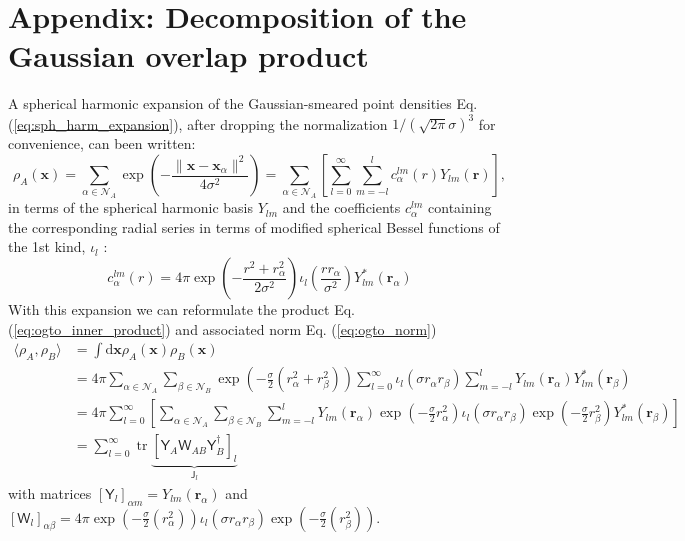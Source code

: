 \documentclass[journal=jctcce,manuscript=article]{achemso}
\newcommand{\eref}[1]{{Eq. (\ref{#1})}}
\newcommand{\tr}{\operatorname{tr}}
\newcommand{\xb}{\mathbf{x}}
\newcommand{\rb}{\mathbf{r}}
\newcommand{\Js}{\mathsf{J}}
\newcommand{\Ys}{\mathsf{Y}}
\newcommand{\Ws}{\mathsf{W}}
\newcommand{\Nc}{\mathcal{N}}
\begin{document}
\section*{Appendix: Decomposition of the Gaussian overlap product} \label{app:soap}
A spherical harmonic expansion of the Gaussian-smeared point densities  \eref{eq:sph_harm_expansion}, after dropping the normalization $1/(\sqrt{2\pi}\sigma)^3$ for convenience, can been written:
\begin{equation}
\rho_A(\xb) = 
\sum_{\alpha\in\Nc_A} \exp\left(- \frac{\|\xb-\xb_{\alpha}\|^2}{4 \sigma^2}\right) 
= \sum_{\alpha\in\Nc_A} \left[ \sum_{l=0}^\infty \sum_{m=-l}^l c_\alpha^{lm}(r) Y_{lm} (\rb) \right] , 
\end{equation}
in terms of the spherical harmonic basis $Y_{lm}$ and the coefficients $c_\alpha^{lm}$ containing the corresponding radial series in terms of modified spherical Bessel functions of the 1st kind, $\iota_l$ :
\begin{equation}
c_\alpha^{lm}(r) = 4 \pi 
\exp \left( -\frac{r^2 +r_\alpha^2}{2\sigma^2} \right) 
\iota_l \left(\frac{r r_\alpha}{\sigma^2}\right)  
Y^*_{lm} (\rb_\alpha) 
\end{equation}  
With this expansion we can reformulate the product \eref{eq:ogto_inner_product} and associated norm \eref{eq:ogto_norm}
\begin{equation}
\begin{split}
\langle \rho_A, \rho_B \rangle 
&=
\int \mathrm{d}\xb \rho_A(\xb) \rho_B(\xb)  \\
&= 4 \pi \sum_{\alpha\in\Nc_A} \sum_{\beta\in\Nc_B} 
\exp\left(-\frac{\sigma}{2} (r_\alpha^2 + r_\beta^2) \right)
\sum_{l=0}^{\infty}
\iota_l (\sigma r_\alpha r_\beta) 
\sum_{m=-l}^{l}
Y_{lm} (\rb_\alpha) Y^*_{lm} (\rb_\beta) \\
&= 4 \pi 
\sum_{l=0}^{\infty} \left[
\sum_{\alpha\in\Nc_A} 
\sum_{\beta\in\Nc_B} 
\sum_{m=-l}^{l}
Y_{lm} (\rb_\alpha) 
\exp\left(-\frac{\sigma}{2} r_\alpha^2 \right)
\iota_l (\sigma r_\alpha r_\beta) 
\exp\left(-\frac{\sigma}{2} r_\beta^2 \right)
Y^*_{lm} (\rb_\beta) 
\right] \\
&= \sum_{l=0}^\infty \tr \underbrace{ \left[ \Ys_A \Ws_{AB} \Ys_B^\dagger \right]_l }_{\Js_l}
\end{split}
\end{equation}
with matrices $[\Ys_l]_{\alpha m} = Y_{lm}(\rb_\alpha)$
and $[\Ws_l]_{\alpha\beta} = 4 \pi \exp\left(-\frac{\sigma}{2} (r_\alpha^2) \right)  \iota_l (\sigma r_\alpha r_\beta) \exp\left(-\frac{\sigma}{2} (r_\beta^2) \right)  $.
\end{document}
